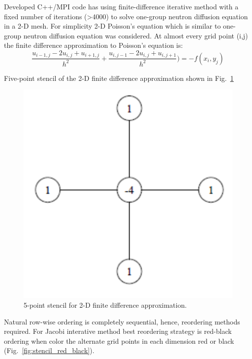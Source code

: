 \documentclass{anstrans}
\begin{document}
Developed C++/MPI code has using finite-difference iterative method with a fixed number of iterations (>4000) to solve one-group neutron diffusion equation in a 2-D mesh. For simplicity 2-D Poisson's equation which is similar to one-group neutron diffusion equation was considered. At almost every grid point (i,j) the finite difference approximation to Poisson's equation is:
\begin{equation}
\frac{u_{i-1,j} - 2u_{i,j}+u_{i+1,j}}{h^2} + \frac{u_{i,j-1} - 2u_{i,j}+u_{i,j+1}}{h^2})
 = -f(x_i, y_j)
\end{equation}

Five-point stencil of the 2-D finite difference approximation shown in Fig.~\ref{fig:stencil}

\begin{figure}[thbp!] %
  \centering
  \vspace{-0.3em}
  \includegraphics[width=0.75\linewidth]{stencil.png}
  \caption{5-point stencil for 2-D finite difference approximation.}
  \vspace{-0.6em}
  \label{fig:stencil}
\end{figure}
\FloatBarrier

Natural row-wise ordering is completely sequential, hence, reordering methods required. For Jacobi interative method best reordering strategy is red-black ordering when color the alternate grid points in each dimension red or black (Fig.~\ref{fig:stencil_red_black}). 
\end{document}

